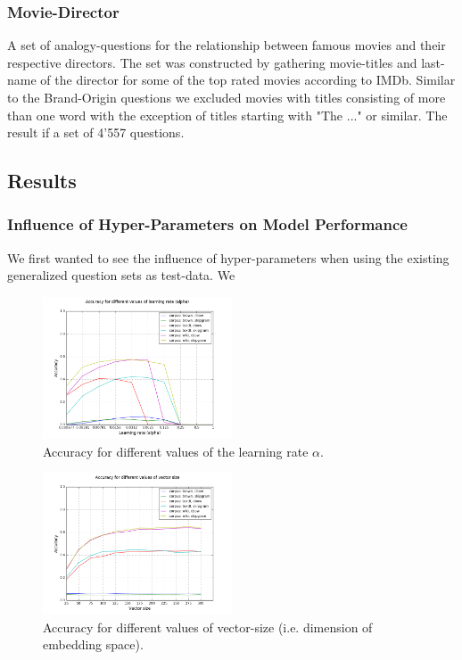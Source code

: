 \documentclass[conference]{IEEEtran}
\begin{document}
\subsubsection{Movie-Director}
A set of analogy-questions for the relationship between famous movies and their respective 
directors. The set was constructed by gathering movie-titles and last-name of the director for 
some of the top rated movies according to IMDb. Similar to the Brand-Origin questions we 
excluded movies with titles consisting of more than one word with the exception of titles 
starting with "The ..." or similar.  The result if a set of 4'557 questions. 


\subsection{Results}

\subsubsection{Influence of Hyper-Parameters on Model Performance}
We first wanted to see the influence of hyper-parameters when using the existing generalized question sets as test-data. We 

\begin{figure}[t]
\centering
\includegraphics[width=0.5\textwidth]{graph_acc_alpha}
\caption{Accuracy for different values of the learning rate $\alpha$. }
\label{fig:alpha}
\end{figure}

\begin{figure}[t]
\centering
\includegraphics[width=0.5\textwidth]{graph_acc_size}
\caption{Accuracy for different values of vector-size (i.e. dimension of embedding space). }
\label{fig:size}
\end{figure}
\end{document}
